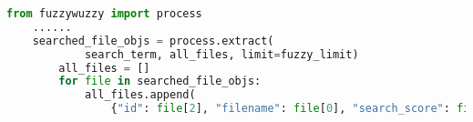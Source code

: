 \begin{lstlisting}[language=python, float, caption={Python code showing a fuzzy string matching search over a collection of resources, using the \textit{fuzzywuzzy} package. The process interface is first imported from \textit{fuzzywuzzy}, then the \texttt{extract()} function performs the matching and extracts the calculated scores for each resource. Where \texttt{search\_term} is a string representing the search query, \texttt{all\_files} is a list of all resources collected by a MongoDB find query and \texttt{fuzzy\_limit} is an integer allowing the returned results to be limited.}, label=lst:pymongo_fuzzy_search]
    from fuzzywuzzy import process
    ......
    searched_file_objs = process.extract(
            search_term, all_files, limit=fuzzy_limit)
        all_files = []
        for file in searched_file_objs:
            all_files.append(
                {"id": file[2], "filename": file[0], "search_score": file[1]})
\end{lstlisting}
